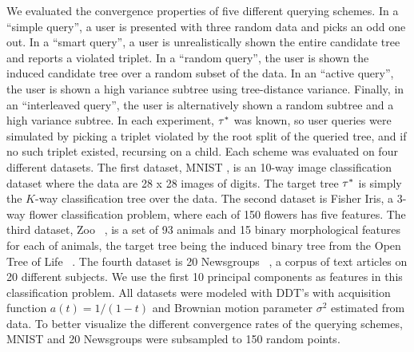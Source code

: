 We evaluated the convergence properties of five different querying schemes.
In a ``simple query'', a user is presented with three random data
and picks an odd one out.
In a ``smart query'', a user is unrealistically shown the entire candidate tree and reports a violated triplet.
In a ``random query'', the user is shown the induced candidate tree over
a random subset of the data.
In an ``active query'', the user is shown a high variance 
subtree using tree-distance variance.
Finally, in an ``interleaved query'', the user is alternatively shown a random
subtree and a high variance subtree.
In each experiment, $\tau^*$ was known, so user queries were simulated
by picking a triplet
violated by the root split of the queried tree, 
and if no such triplet existed, recursing on a child.
Each scheme was evaluated on four different datasets.
The first dataset, MNIST \citep{MNIST}, is an 10-way image classification
dataset where the data are 28 x 28 images of digits.
The target tree $\tau^*$ is simply the $K$-way classification 
tree over the data.
The second dataset is Fisher Iris, a 3-way flower
classification problem, where each of 150 flowers has
five features.
The third dataset, Zoo ~\citep{Lichman2013}, is a set of 93 animals
and 15 binary morphological features for each of animals,
the target tree being the induced binary tree 
from the Open Tree of Life ~\citep{Hinchliff2015}.
The fourth dataset is 20 Newsgroups ~\citep{Joachims1997}, a
corpus of text articles on 20 different subjects. We use
the first 10 principal components as features
in this classification problem.
All datasets were modeled with DDT's with
acquisition function $a(t) = 1/(1 - t)$
and Brownian motion parameter $\sigma^2$ estimated from data.
To better visualize the different convergence rates
of the querying schemes, MNIST and  20 Newsgroups were subsampled
to 150 random points.

